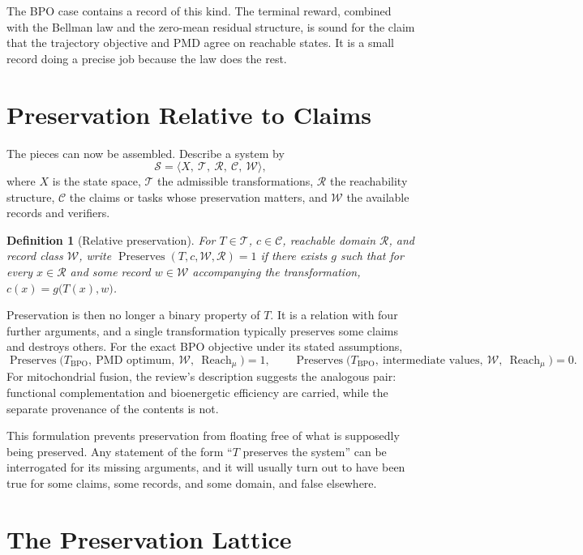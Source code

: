 \documentclass[11pt]{article}
\newtheorem{definition}{Definition}
\theoremstyle{remark}
\DeclareMathOperator{\Reach}{Reach}
\DeclareMathOperator{\Pres}{Preserves}
\begin{document}
The BPO case contains a record of this kind. The terminal reward, combined with the Bellman law and the zero-mean residual structure, is sound for the claim that the trajectory objective and PMD agree on reachable states. It is a small record doing a precise job because the law does the rest.

\section{Preservation Relative to Claims}

The pieces can now be assembled. Describe a system by
\[
\mathcal S = \langle X,\ \mathcal T,\ \mathcal R,\ \mathcal C,\ \mathcal W\rangle,
\]
where $X$ is the state space, $\mathcal T$ the admissible transformations, $\mathcal R$ the reachability structure, $\mathcal C$ the claims or tasks whose preservation matters, and $\mathcal W$ the available records and verifiers.

\begin{definition}[Relative preservation]
For $T\in\mathcal T$, $c\in\mathcal C$, reachable domain $\mathcal R$, and record class $\mathcal W$, write $\Pres(T,c,\mathcal W,\mathcal R)=1$ if there exists $g$ such that for every $x\in\mathcal R$ and some record $w\in\mathcal W$ accompanying the transformation, $c(x)=g\bigl(T(x),w\bigr)$.
\end{definition}

Preservation is then no longer a binary property of $T$. It is a relation with four further arguments, and a single transformation typically preserves some claims and destroys others. For the exact BPO objective under its stated assumptions,
\[
\Pres\bigl(T_{\mathrm{BPO}},\ \text{PMD optimum},\ \mathcal W,\ \Reach_\mu\bigr)=1,
\qquad
\Pres\bigl(T_{\mathrm{BPO}},\ \text{intermediate values},\ \mathcal W,\ \Reach_\mu\bigr)=0.
\]
For mitochondrial fusion, the review's description suggests the analogous pair: functional complementation and bioenergetic efficiency are carried, while the separate provenance of the contents is not.

This formulation prevents preservation from floating free of what is supposedly being preserved. Any statement of the form ``$T$ preserves the system'' can be interrogated for its missing arguments, and it will usually turn out to have been true for some claims, some records, and some domain, and false elsewhere.

\section{The Preservation Lattice}
\end{document}
